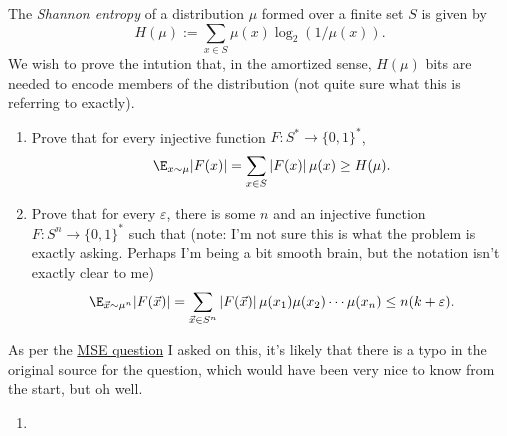 \begin{exercisenum}
    The \textit{Shannon entropy} of a distribution \( \mu \) formed over a finite set \( S \) is given by
    \[
        H(\mu) := \sum_{x \in S} \mu (x) \log_2(1 / \mu(x))
    .\]
    We wish to prove the intution that, in the amortized sense, \( H(\mu) \) bits are needed to encode members of the distribution (not quite sure what this is referring to exactly).
    \begin{enumerate}
        \item Prove that for every injective function \( F : S^* \to \{0, 1 \}^* \),
            \[
                \E_{x \sim \mu} |F(x)| = \sum_{x \in S} |F(x)| \, \mu(x) \ge H(\mu)
            .\]
        \item Prove that for every \( \varepsilon \), there is some \( n \) and an injective function \( F : S^n \to \{0, 1\}^* \) such that (note: I'm not sure this is what the problem is exactly asking. Perhaps I'm being a bit smooth brain, but the notation isn't exactly clear to me)
            \[
                \E_{\vec{x} \sim \mu^n} |F(\vec{x})| = \sum_{\vec{x} \in S^n} |F(\vec{x})| \, \mu(x_1) \mu(x_2) \cdots \mu(x_n) \le n(k + \varepsilon)
            .\]
    \end{enumerate}
\end{exercisenum}

\begin{solution}
    As per the \href{https://math.stackexchange.com/questions/4946091/doubts-on-an-intensive-introduction-to-cryptography-exercise-about-shannons-e/4946095#4946095}{MSE question} I asked on this, it's likely that there is a typo in the original source for the question, which would have been very nice to know from the start, but oh well.
    \begin{enumerate}
        \item 
    \end{enumerate}
\end{solution}

